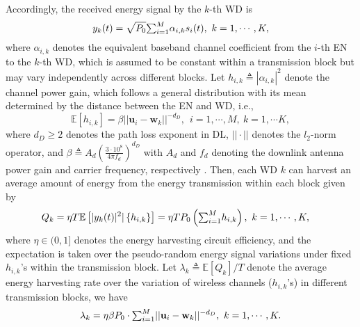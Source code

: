 \documentclass[journal, draftcls, one column, 12pt]{IEEEtran}
\begin{document}
Accordingly, the received energy signal by the $k$-th WD is
\begin{equation}
y_{k}(t) = \sqrt{P_0} \mathsmaller\sum_{i=1}^M \alpha_{i,k}  s_{i}(t), \ k=1,\cdots,K,
\end{equation}
where $\alpha_{i,k}$ denotes the equivalent baseband channel coefficient from the $i$-th EN to the $k$-th WD, which is assumed to be constant within a transmission block but may vary independently across different blocks. Let $h_{i,k}\triangleq |\alpha_{i,k}|^2$ denote the channel power gain, which follows a general distribution with its mean determined by the distance between the EN and WD, i.e.,
\begin{equation}
\label{3}
\mathbb{E}\left[h_{i,k}\right] =  \beta ||\mathbf{u}_i -\mathbf{w}_k||^{-d_D}, \ \ i=1,\cdots,M, \ k =1,\cdots K,
\end{equation}
where $d_D \geq 2$ denotes the path loss exponent in DL, $||\cdot||$ denotes the $l_2$-norm operator, and $\beta \triangleq A_d\left(\frac{3\cdot10^8}{4\pi f_d}\right)^{d_D}$ with $A_d$ and $f_d$ denoting the downlink antenna power gain and carrier frequency, respectively \cite{2005:Goldsmith}. Then, each WD $k$ can harvest an average amount of energy from the energy transmission within each block given by \cite{2013:Zhou}
\begin{equation}
\label{6}
\begin{aligned}
Q_{k} &= \eta T \mathbb{E} \left[|y_{k}(t)|^2|\left\{h_{i,k}\right\}\right] = \eta T P_0 \left( \mathsmaller\sum_{i=1}^M  h_{i,k}\right), \ k= 1,\cdots, K,
\end{aligned}
\end{equation}
where $\eta \in(0,1]$ denotes the energy harvesting circuit efficiency, and the expectation is taken over the pseudo-random energy signal variations under fixed $h_{i,k}$'s within the transmission block. Let $\lambda_k \triangleq \mathbb{E}\left[Q_k\right]/T$ denote the average energy harvesting rate over the variation of wireless channels ($h_{i,k}$'s) in different transmission blocks, we have
\begin{equation}
\label{10}
\lambda_k =  \eta \beta P_0 \cdot \mathsmaller\sum_{i=1}^M ||\mathbf{u}_i -\mathbf{w}_k||^{-d_D}, \ k=1,\cdots,K.
\end{equation}
\end{document}
